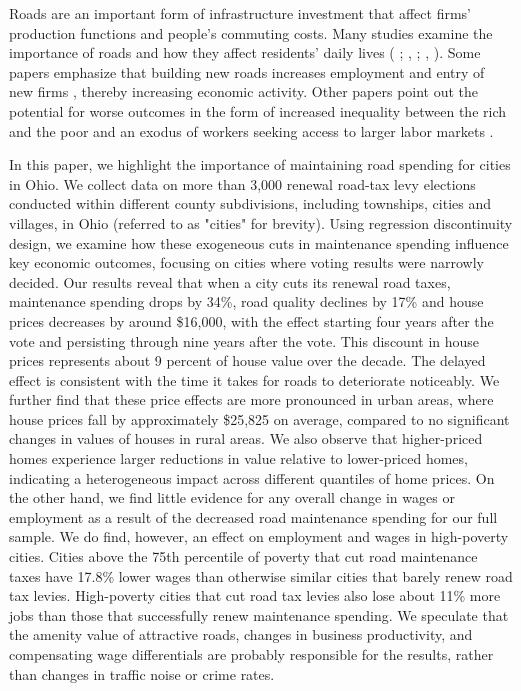 Roads are an important form of infrastructure investment that affect firms’ production functions and people’s commuting costs. Many studies examine the importance of roads and how they affect residents' daily lives ( \citeyear{currier2023};  \citeyear{adukia2020},  \citeyear{banerjee2020};  \citeyear{banerjee2020},  \citeyear{banerjee2020}). Some papers emphasize that building new roads increases employment and entry of new firms \citep{gibbons2019new}, thereby increasing economic activity. Other papers point out the potential for worse outcomes in the form of increased inequality between the rich and the poor \citep{hettige2006} and an exodus of workers seeking access to larger labor markets \citep{asher2020}.  
 
In this paper, we highlight the importance of maintaining road spending for cities in Ohio. We collect data on more than 3,000 renewal road-tax levy elections conducted within different county subdivisions, including townships, cities and villages, in Ohio (referred to as "cities" for brevity). Using regression discontinuity design, we examine how these exogeneous cuts in maintenance spending influence key economic outcomes, focusing on cities where voting results were narrowly decided. Our results reveal that when a city cuts its renewal road taxes, maintenance spending drops by 34\%, road quality declines by 17\% and house prices decreases by around \$16,000, with the effect starting four years after the vote and persisting through nine years after the vote. This discount in house prices represents about 9 percent of house value over the decade.  The delayed effect is consistent with the time it takes for roads to deteriorate noticeably.  We further find that these price effects are more pronounced in urban areas, where house prices fall by approximately \$25,825 on average, compared to no significant changes in values of houses in rural areas. We also observe that higher-priced homes experience larger reductions in value relative to lower-priced homes, indicating a heterogeneous impact across different quantiles of home prices. On the other hand, we find little evidence for any overall change in wages or employment as a result of the decreased road maintenance spending for our full sample.  We do find, however, an effect on employment and wages in high-poverty cities.  Cities above the 75th percentile of poverty that cut road maintenance taxes have 17.8\% lower wages than otherwise similar cities that barely renew road tax levies.  High-poverty cities that cut road tax levies also lose about 11\% more jobs than those that successfully renew maintenance spending.  We speculate that the amenity value of attractive roads, changes in business productivity, and compensating wage differentials are probably responsible for the results, rather than changes in traffic noise or crime rates.


